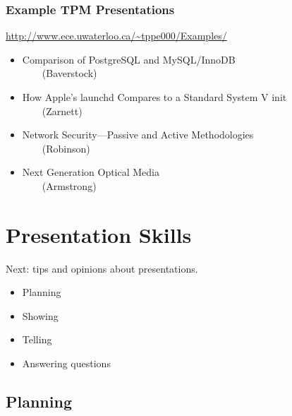 \documentclass{beamer}
\begin{document}
\begin{frame}

\frametitle{Example TPM Presentations}

\url{http://www.ece.uwaterloo.ca/~tppe000/Examples/}

\small
\begin{itemize}
\item Comparison of PostgreSQL and MySQL/InnoDB\\
$\qquad$(Baverstock)
\item How Apple's launchd Compares to a Standard System V init\\
$\qquad$(Zarnett)
\item Network Security---Passive and Active Methodologies\\
$\qquad$(Robinson)
\item Next Generation Optical Media\\
$\qquad$(Armstrong)
\end{itemize}



\end{frame}


\section{Presentation Skills}

\begin{frame}

{\Large
Next: tips and opinions about presentations.
}
\begin{itemize}
\item Planning
\item Showing
\item Telling
\item Answering questions
\end{itemize}

\end{frame}

\subsection{Planning}
\end{document}
